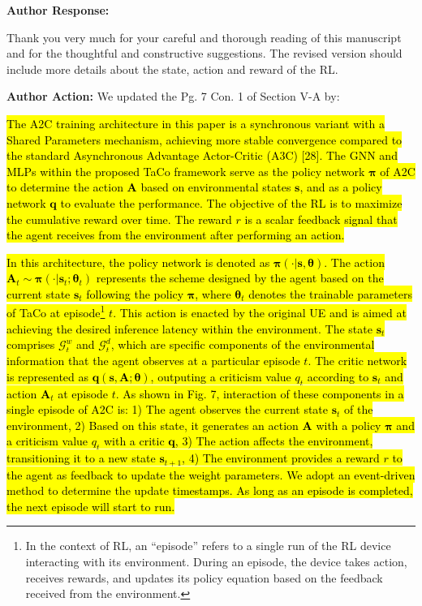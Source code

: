 \documentclass{ar2rc}
\begin{document}
\textbf{Author Response:}

\noindent Thank you very much for your careful and thorough reading of this manuscript and for the thoughtful and constructive suggestions. The revised version should include more details about the state, action and reward of the RL. 


\textbf{Author Action:}
\noindent We updated the Pg. 7 Con. 1 of Section V-A by:

\hl{The A2C training architecture in this paper is a synchronous variant with a Shared Parameters mechanism, achieving more stable convergence compared to the standard Asynchronous Advantage Actor-Critic (A3C) [28]. The GNN and MLPs within the proposed TaCo framework serve as the policy network $\boldsymbol{\pi}$ of A2C to determine the action $\mathbf{A}$ based on environmental states $\boldsymbol{s}$, and as a policy network $\boldsymbol{q}$ to evaluate the performance. The objective of the RL is to maximize the cumulative reward over time. The reward $r$ is a scalar feedback signal that the agent receives from the environment after performing an action. }

\hl{In this architecture, the policy network is denoted as $\boldsymbol{\pi}(\cdot|\boldsymbol{s}, \boldsymbol{\theta})$. The action $\mathbf{A}_t \sim \boldsymbol{\pi}(\cdot|\boldsymbol{s}_t; \boldsymbol{\theta}_t)$ represents the scheme designed by the agent based on the current state $\boldsymbol{s}_t$ following the policy $\boldsymbol{\pi}$, where $\boldsymbol{\theta}_t$ denotes the trainable parameters of TaCo at episode\footnote{In the context of RL, an ``episode'' refers to a single run of the RL device interacting with its environment. During an episode, the device takes action, receives rewards, and updates its policy equation based on the feedback received from the environment.} $t$. This action is enacted by the original UE and is aimed at achieving the desired inference latency within the environment. The state $\boldsymbol{s}_t$ comprises $\mathcal{G}^{w}_t$ and $\mathcal{G}^{d}_t$, which are specific components of the environmental information that the agent observes at a particular episode $t$. 
The critic network is represented as $\boldsymbol{q}(\boldsymbol{s}, \mathbf{A}; \boldsymbol{\theta})$, outputing a criticism value $q_t$ according to $\boldsymbol{s}_t$ and action $\mathbf{A}_t$ at episode $t$. 
As shown in Fig. 7, interaction of these components in a single episode of A2C is: 1) The agent observes the current state $\boldsymbol{s}_t$ of the environment, 2) Based on this state, it generates an action $\mathbf{A}$ with a policy $\boldsymbol{\pi}$ and a criticism value $q_t$ with a critic $\boldsymbol{q}$, 3) The action affects the environment, transitioning it to a new state $\boldsymbol{s}_{t+1}$, 4) The environment provides a reward $r$ to the agent as feedback to update the weight parameters. We adopt an event-driven method to determine the update timestamps. As long as an episode is completed, the next episode will start to run.}
\end{document}

